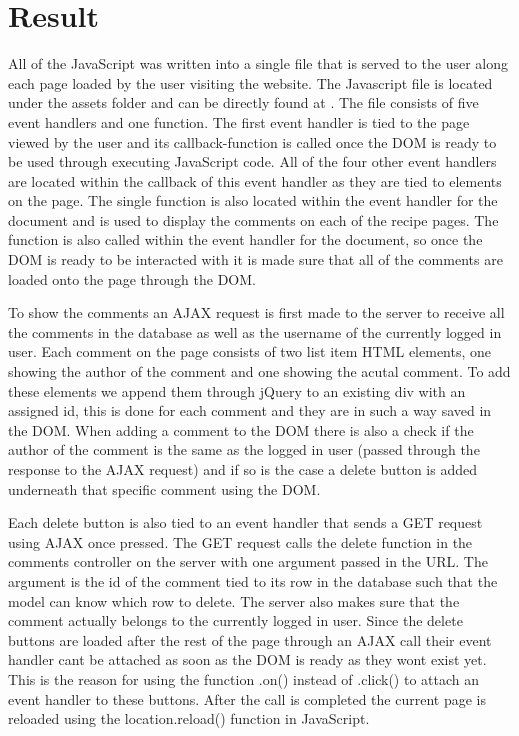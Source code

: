 \documentclass[a4paper]{scrartcl}
\begin{document}
\section{Result}
All of the JavaScript was written into a single file that is served to the user along each page loaded by the user visiting the website. The Javascript file is located under the assets folder and can be directly found at \citet{kimblad_git_2019_file}. The file consists of five event handlers and one function. The first event handler \citet{kimblad_git_2019_1} is tied to the page viewed by the user and its callback-function is called once the DOM is ready to be used through executing JavaScript code. All of the four other event handlers are located within the callback of this event handler as they are tied to elements on the page. The single function \citet{kimblad_git_2019_77} is also located within the event handler for the document and is used to display the comments on each of the recipe pages. The function is also called \citet{kimblad_git_2019_5} within the event handler for the document, so once the DOM is ready to be interacted with it is made sure that all of the comments are loaded onto the page through the DOM. 

To show the comments an AJAX request is first made to the server to receive all the comments in the database as well as the username of the currently logged in user. Each comment on the page consists of two list item HTML elements, one showing the author of the comment and one showing the acutal comment. To add these elements we append them \citet{kimblad_git_2019_97} through jQuery to an existing div with an assigned id, this is done for each comment and they are in such a way saved in the DOM. When adding a comment to the DOM there is also a check if the author of the comment is the same as the logged in user (passed through the response to the AJAX request) and if so is the case a delete button is added underneath that specific comment using the DOM.

Each delete button is also tied to an event handler \citet{kimblad_git_2019_54} that sends a GET request using AJAX once pressed. The GET request calls the delete function in the comments controller on the server with one argument passed in the URL. The argument is the id of the comment tied to its row in the database such that the model can know which row to delete. The server also makes sure that the comment actually belongs to the currently logged in user. 
Since the delete buttons are loaded after the rest of the page through an AJAX call their event handler cant be attached as soon as the DOM is ready as they wont exist yet. This is the reason for using the function .on() instead of .click() to attach an event handler to these buttons.
After the call is completed the current page is reloaded using the location.reload() function in JavaScript.
\end{document}
